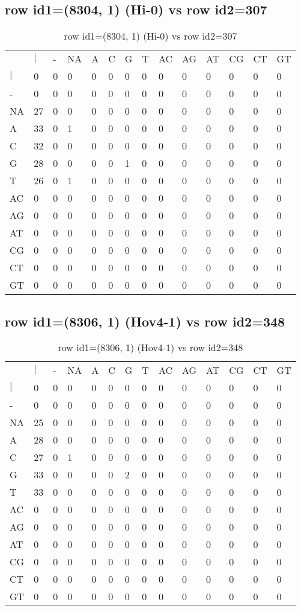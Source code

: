 \subsection{row id1=(8304, 1) (Hi-0) vs row id2=307}
\begin{center}
\begin{longtable}{|l|l|l|l|l|l|l|l|l|l|l|l|l|l|}
\caption{row id1=(8304, 1) (Hi-0) vs row id2=307} \label{table_dm486}\\
\hline
\\
\hline
&$|$&-&NA&A&C&G&T&AC&AG&AT&CG&CT&GT\\
$|$&0&0&0&0&0&0&0&0&0&0&0&0&0\\
-&0&0&0&0&0&0&0&0&0&0&0&0&0\\
NA&27&0&0&0&0&0&0&0&0&0&0&0&0\\
A&33&0&1&0&0&0&0&0&0&0&0&0&0\\
C&32&0&0&0&0&0&0&0&0&0&0&0&0\\
G&28&0&0&0&0&1&0&0&0&0&0&0&0\\
T&26&0&1&0&0&0&0&0&0&0&0&0&0\\
AC&0&0&0&0&0&0&0&0&0&0&0&0&0\\
AG&0&0&0&0&0&0&0&0&0&0&0&0&0\\
AT&0&0&0&0&0&0&0&0&0&0&0&0&0\\
CG&0&0&0&0&0&0&0&0&0&0&0&0&0\\
CT&0&0&0&0&0&0&0&0&0&0&0&0&0\\
GT&0&0&0&0&0&0&0&0&0&0&0&0&0\\
\hline
\end{longtable}
\end{center}

\subsection{row id1=(8306, 1) (Hov4-1) vs row id2=348}
\begin{center}
\begin{longtable}{|l|l|l|l|l|l|l|l|l|l|l|l|l|l|}
\caption{row id1=(8306, 1) (Hov4-1) vs row id2=348} \label{table_dm488}\\
\hline
\\
\hline
&$|$&-&NA&A&C&G&T&AC&AG&AT&CG&CT&GT\\
$|$&0&0&0&0&0&0&0&0&0&0&0&0&0\\
-&0&0&0&0&0&0&0&0&0&0&0&0&0\\
NA&25&0&0&0&0&0&0&0&0&0&0&0&0\\
A&28&0&0&0&0&0&0&0&0&0&0&0&0\\
C&27&0&1&0&0&0&0&0&0&0&0&0&0\\
G&33&0&0&0&0&2&0&0&0&0&0&0&0\\
T&33&0&0&0&0&0&0&0&0&0&0&0&0\\
AC&0&0&0&0&0&0&0&0&0&0&0&0&0\\
AG&0&0&0&0&0&0&0&0&0&0&0&0&0\\
AT&0&0&0&0&0&0&0&0&0&0&0&0&0\\
CG&0&0&0&0&0&0&0&0&0&0&0&0&0\\
CT&0&0&0&0&0&0&0&0&0&0&0&0&0\\
GT&0&0&0&0&0&0&0&0&0&0&0&0&0\\
\hline
\end{longtable}
\end{center}

